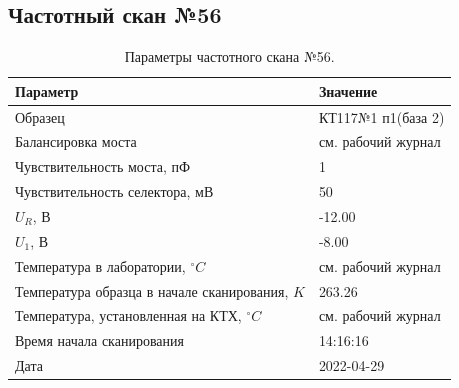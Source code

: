 \subsection{Частотный скан №56}
\begin{table}[!ht]
    \centering
    \caption{Параметры частотного скана №56.}
    \begin{tabular}{|l|l|}
        \hline
        Параметр                                       & Значение                  \\ \hline
        Образец                                        & КТ117№1 п1(база 2)        \\ \hline
        Балансировка моста                             & см. рабочий журнал        \\ \hline
        Чувствительность моста, пФ                     & 1                         \\ \hline
        Чувствительность селектора, мВ                 & 50                        \\ \hline
        $U_R$, В                                       & -12.00                    \\ \hline
        $U_1$, В                                       & -8.00                     \\ \hline
        Температура в лаборатории, $^\circ C$          & см. рабочий журнал        \\ \hline
        Температура образца в начале сканирования, $K$ & 263.26                    \\ \hline
        Температура, установленная на КТХ, $^\circ C$  & см. рабочий журнал        \\ \hline
        Время начала сканирования                      & 14:16:16                  \\ \hline
        Дата                                           & 2022-04-29                \\ \hline
    \end{tabular}
    \label{table:frequency_scan_56}
\end{table}

